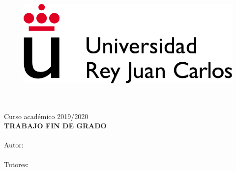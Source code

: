 \documentclass[
12pt, %
spanish, %
onehalfspacing, %
parskip, %
headsepline, %
openany %
]{MastersDoctoralThesis} %
\author{José Miguel García Benayas} %
\begin{document}
\frontmatter %

\pagestyle{plain} %


\begin{titlepage}
\begin{center}

\vspace*{.01\textheight}
\begin{figure}
\begin{center}
\includegraphics[scale=0.8]{Figures/URJC_logo.pdf}
\end{center}
\end{figure}
{\Large \MakeUppercase{\facname}}\\[0.5cm]
{\large \MakeUppercase{\degreename}}\\[0.5cm] %
{\large Curso académico 2019/2020}\\[1.5cm] %
{\large \textbf{TRABAJO FIN DE GRADO}}\\[0.5cm] %

{\Large \textbf{\MakeUppercase{\ttitle}}}\\[5cm] %

{\normalsize Autor:\\{\authorname}}\\[0.5cm]  %

{\normalsize Tutores:\\{\supname}}\\ %


\end{center}
\end{titlepage}
\end{document}
